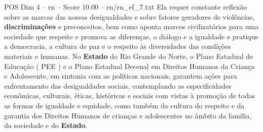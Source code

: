 \begin{textsample}{POS Dim 4 – rn – Score 10.00 – rn/rn\_ef\_7.txt}
Ela requer constante reflexão sobre as marcas das nossas desigualdades e sobre fatores geradores de violências, \textbf{discriminações} e preconceitos, bem como aponta marcos civilizatórios para uma sociedade que respeite e promova as diferenças, o diálogo e a igualdade e pratique a democracia, a cultura de paz e o respeito às diversidades das condições materiais e humanas.
No \textbf{Estado} do Rio Grande do Norte, o Plano Estadual de Educação ( PEE ) e o Plano Estadual Decenal em Direitos Humanos da Criança e Adolescente, em sintonia com as políticas nacionais, garantem ações para enfrentamento das desigualdades sociais, contemplando as especificidades econômicas, culturais, éticas, históricas e sociais com vistas à promoção de todas as formas de igualdade e equidade, como também da cultura do respeito e da garantia dos Direitos Humanos de crianças e adolescentes no âmbito da família, da sociedade e do \textbf{Estado}.

\end{textsample}
